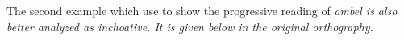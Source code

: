 % 
% 

The second example which \citet{SmithEtAl2007} use to show the progressive reading of \em ambel \em is also better analyzed as inchoative. It is given below in the original orthography.


